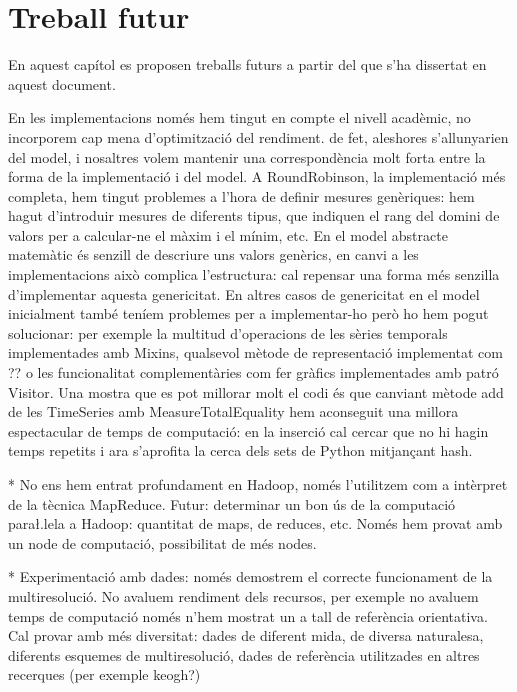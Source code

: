 \chapter{Treball futur}
\label{sec:futur}


En aquest capítol es proposen treballs futurs a partir del que s'ha  dissertat en aquest document.




En les implementacions només hem tingut en compte el nivell acadèmic,
no incorporem cap mena d'optimització del rendiment. de fet, aleshores
s'allunyarien del model, i nosaltres volem mantenir una
correspondència molt forta entre la forma de la implementació i del
model.  A RoundRobinson, la implementació més completa, hem tingut
problemes a l'hora de definir mesures genèriques: hem hagut
d'introduir mesures de diferents tipus, que indiquen el rang del
domini de valors per a calcular-ne el màxim i el mínim, etc. En el
model abstracte matemàtic és senzill de descriure uns valors genèrics,
en canvi a les implementacions això complica l'estructura: cal
repensar una forma més senzilla d'implementar aquesta genericitat. En
altres casos de genericitat en el model inicialment també teníem
problemes per a implementar-ho però ho hem pogut solucionar: per
exemple la multitud d'operacions de les sèries temporals implementades
amb Mixins, qualsevol mètode de representació implementat com ?? o les
funcionalitat complementàries com fer gràfics implementades amb patró
Visitor.  Una mostra que es pot millorar molt el codi és que canviant
mètode add de les TimeSeries amb MeasureTotalEquality hem aconseguit
una millora espectacular de temps de computació: en la inserció cal
cercar que no hi hagin temps repetits i ara s'aprofita la cerca dels
sets de Python mitjançant hash.


* No ens hem entrat profundament en Hadoop, només l'utilitzem com a intèrpret de la tècnica MapReduce. Futur: determinar un bon ús de la computació para\l.lela a Hadoop: quantitat de maps, de reduces, etc. Només hem provat amb un node de computació, possibilitat de més nodes.



* Experimentació amb dades: només demostrem el correcte funcionament de la multiresolució. No avaluem rendiment dels recursos, per exemple no avaluem temps de computació només n'hem mostrat un a tall de referència orientativa.  Cal provar amb més diversitat: dades de diferent mida, de diversa naturalesa, diferents esquemes de multiresolució, dades de referència utilitzades en altres recerques (per exemple keogh?)



